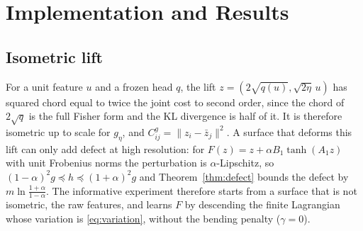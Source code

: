 \documentclass[journal]{IEEEtran}
\begin{document}
\section{Implementation and Results}
\subsection{Isometric lift}
For a unit feature $u$ and a frozen head $q$, the lift $z=(2\sqrt{q(u)},\sqrt{2\eta}\,u)$ has squared chord equal to twice the joint cost to second order, since the chord of $2\sqrt q$ is the full Fisher form and the KL divergence is half of it. It is therefore isometric up to scale for $g_\eta$, and $C^g_{ij}=\|z_i-\bar z_j\|^2$. A surface that deforms this lift can only add defect at high resolution: for $F(z)=z+\alpha B_1\tanh(A_1z)$ with unit Frobenius norms the perturbation is $\alpha$-Lipschitz, so $(1-\alpha)^2g\preceq h\preceq(1+\alpha)^2g$ and Theorem~\ref{thm:defect} bounds the defect by $m\ln\frac{1+\alpha}{1-\alpha}$. The informative experiment therefore starts from a surface that is not isometric, the raw features, and learns $F$ by descending the finite Lagrangian whose variation is \eqref{eq:variation}, without the bending penalty ($\gamma=0$).
\end{document}
